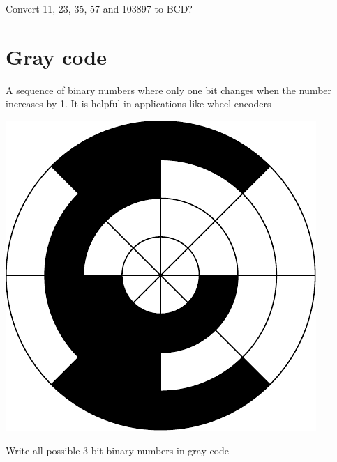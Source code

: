 \begin{prob}
  Convert 11, 23, 35, 57 and 103897 to BCD?
\end{prob}
\vspace{10em}

\section{Gray code}
A sequence of binary numbers where only one bit changes when the number
increases by 1. It is helpful in applications like wheel encoders

\includegraphics[width=0.5\linewidth]{gray-code.pdf}

\begin{prob}
  Write all possible 3-bit binary numbers in gray-code
\end{prob}
\vspace{10em}
